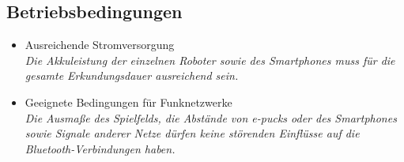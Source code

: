 \documentclass[10pt,a4paper]{article}
\begin{document}
		\subsection{Betriebsbedingungen}
			\begin{itemize}
				\item Ausreichende Stromversorgung
					\\ \textsl{ Die Akkuleistung der einzelnen Roboter sowie des Smartphones muss für die gesamte
						Erkundungsdauer ausreichend sein.}
				\item Geeignete Bedingungen für Funknetzwerke
					\\ \textsl{ Die Ausmaße des Spielfelds, die Abstände von e-pucks oder des Smartphones sowie
						Signale anderer Netze dürfen keine störenden Einflüsse auf die Bluetooth-Verbindungen haben.}
			\end{itemize}
			
			
\end{document}
